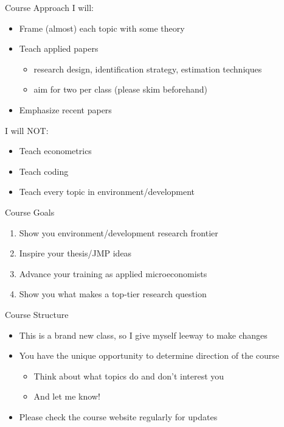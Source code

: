 \documentclass[
  ignorenonframetext,
  aspectratio=169]{beamer}
\providecommand{\tightlist}{%
  \setlength{\itemsep}{0pt}\setlength{\parskip}{0pt}}
\begin{document}
\begin{frame}{Course Approach}
\protect\hypertarget{course-approach}{}
I will:

\begin{itemize}
\item
  Frame (almost) each topic with some theory
\item
  Teach applied papers

  \begin{itemize}
  \tightlist
  \item
    research design, identification strategy, estimation techniques
  \item
    aim for two per class (please skim beforehand)
  \end{itemize}
\item
  Emphasize recent papers
\end{itemize}

\vfill

I will NOT:

\begin{itemize}
\item
  Teach econometrics
\item
  Teach coding
\item
  Teach every topic in environment/development
\end{itemize}
\end{frame}

\begin{frame}{Course Goals}
\protect\hypertarget{course-goals}{}
\begin{enumerate}
\item
  Show you environment/development research frontier
\item
  Inspire your thesis/JMP ideas
\item
  Advance your training as applied microeconomists
\item
  Show you what makes a top-tier research question
\end{enumerate}
\end{frame}

\begin{frame}{Course Structure}
\protect\hypertarget{course-structure}{}
\begin{itemize}
\tightlist
\item
  This is a brand new class, so I give myself leeway to make changes
  \vfill
\item
  You have the unique opportunity to determine direction of the course

  \begin{itemize}
  \tightlist
  \item
    Think about what topics do and don't interest you
  \item
    And let me know! \vfill
  \end{itemize}
\item
  Please check the course website regularly for updates
\end{itemize}
\end{frame}
\end{document}
